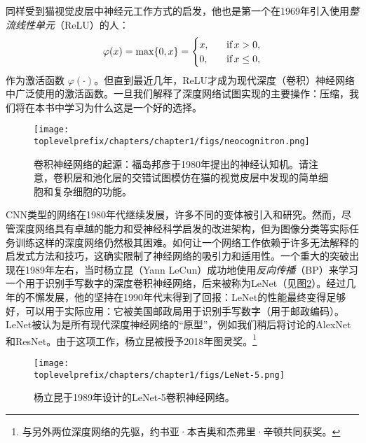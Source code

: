 \documentclass[../../book-main.tex]{subfiles}
\begin{document}
同样受到猫视觉皮层中神经元工作方式的启发，他也是第一个在1969年引入使用{\em 整流线性单元}（ReLU）的人\cite{Fukushima-1969}：
\begin{equation}
    \varphi(x) = \max\{0, x\} = \begin{cases}x, & \text{if} \, x > 0, \\ 0, \quad & \text{if} \, x \leq 0,\end{cases}
\end{equation}
作为激活函数 $\varphi(\cdot)$。但直到最近几年，ReLU才成为现代深度（卷积）神经网络中广泛使用的激活函数。一旦我们解释了深度网络试图实现的主要操作：压缩，我们将在本书中学习为什么这是一个好的选择。

\begin{figure}
    \centering
    \texttt{[image: \\toplevelprefix/chapters/chapter1/figs/neocognitron.png]}
    \caption{卷积神经网络的起源：福岛邦彦于1980年提出的神经认知机。请注意，卷积层和池化层的交错试图模仿在猫的视觉皮层中发现的简单细胞和复杂细胞的功能。}
    \label{fig:neocognitron}
\end{figure}

CNN类型的网络在1980年代继续发展，许多不同的变体被引入和研究。然而，尽管深度网络具有卓越的能力和受神经科学启发的改进架构，但为图像分类等实际任务训练这样的深度网络仍然极其困难。如何让一个网络工作依赖于许多无法解释的启发式方法和技巧，这确实限制了神经网络的吸引力和适用性。一个重大的突破出现在1989年左右，当时杨立昆（Yann LeCun）成功地使用{\em 反向传播}（BP）来学习一个用于识别手写数字的深度卷积神经网络\cite{LeCun-1989}，后来被称为LeNet（见图\ref{fig:LeNet-5}）。经过几年的不懈发展，他的坚持在1990年代末得到了回报：LeNet的性能最终变得足够好，可以用于实际应用\cite{LeCun-1998}：它被美国邮政局用于识别手写数字（用于邮政编码）。LeNet被认为是所有现代深度神经网络的“原型”，例如我们稍后将讨论的AlexNet和ResNet。由于这项工作，杨立昆被授予2018年图灵奖。\footnote{与另外两位深度网络的先驱，约书亚·本吉奥和杰弗里·辛顿共同获奖。}

\begin{figure}
    \centering
\texttt{[image: \\toplevelprefix/chapters/chapter1/figs/LeNet-5.png]}
    \caption{杨立昆于1989年设计的LeNet-5卷积神经网络。}
    \label{fig:LeNet-5}
\end{figure}
\end{document}
